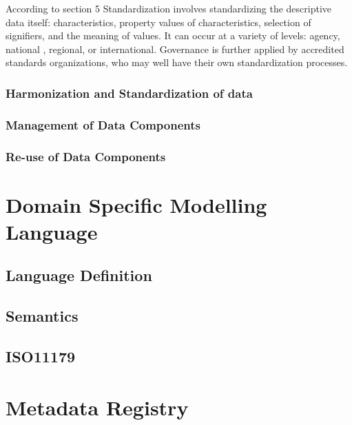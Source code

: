 \documentclass{llncs}
\begin{document}
According to section 5 Standardization involves standardizing the descriptive data itself: characteristics, property values of characteristics, selection of signifiers, and the meaning of values.  It can occur at a variety of levels: agency, national , regional, or international. Governance is further applied by accredited standards organizations, who may well have their own standardization processes.


\subsubsection{Harmonization and Standardization of data}


\subsubsection{Management of Data Components}


\subsubsection{Re-use of Data Components}






\section{Domain Specific Modelling Language}

\subsection{Language Definition}

\subsection{Semantics}


\subsection{ISO11179}



\section{Metadata Registry}

\subsection{}
\end{document}
